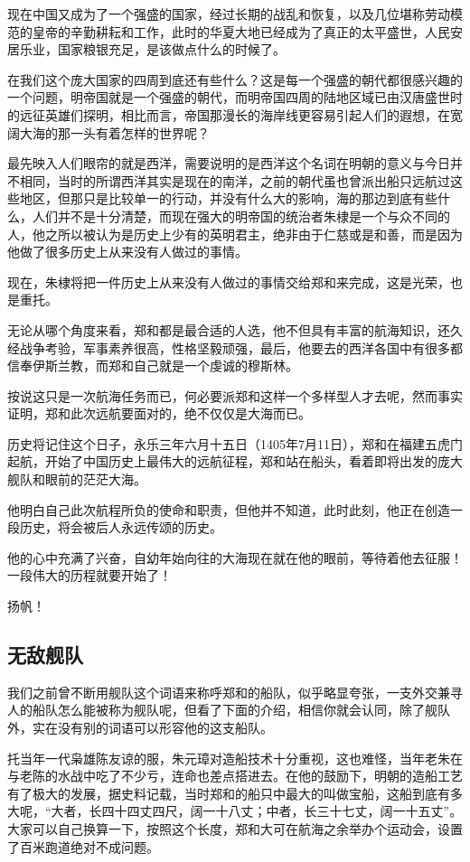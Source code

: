 \begin{multicols}{\theparacolNo}
现在中国又成为了一个强盛的国家，经过长期的战乱和恢复，以及几位堪称劳动模范的皇帝的辛勤耕耘和工作，此时的华夏大地已经成为了真正的太平盛世，人民安居乐业，国家粮银充足，是该做点什么的时候了。

在我们这个庞大国家的四周到底还有些什么？这是每一个强盛的朝代都很感兴趣的一个问题，明帝国就是一个强盛的朝代，而明帝国四周的陆地区域已由汉唐盛世时的远征英雄们探明，相比而言，帝国那漫长的海岸线更容易引起人们的遐想，在宽阔大海的那一头有着怎样的世界呢？

最先映入人们眼帘的就是西洋，需要说明的是西洋这个名词在明朝的意义与今日并不相同，当时的所谓西洋其实是现在的南洋，之前的朝代虽也曾派出船只远航过这些地区，但那只是比较单一的行动，并没有什么大的影响，海的那边到底有些什么，人们并不是十分清楚，而现在强大的明帝国的统治者朱棣是一个与众不同的人，他之所以被认为是历史上少有的英明君主，绝非由于仁慈或是和善，而是因为他做了很多历史上从来没有人做过的事情。

现在，朱棣将把一件历史上从来没有人做过的事情交给郑和来完成，这是光荣，也是重托。

无论从哪个角度来看，郑和都是最合适的人选，他不但具有丰富的航海知识，还久经战争考验，军事素养很高，性格坚毅顽强，最后，他要去的西洋各国中有很多都信奉伊斯兰教，而郑和自己就是一个虔诚的穆斯林。

按说这只是一次航海任务而已，何必要派郑和这样一个多样型人才去呢，然而事实证明，郑和此次远航要面对的，绝不仅仅是大海而已。

历史将记住这个日子，永乐三年六月十五日（1405年7月11日），郑和在福建五虎门起航，开始了中国历史上最伟大的远航征程，郑和站在船头，看着即将出发的庞大舰队和眼前的茫茫大海。

他明白自己此次航程所负的使命和职责，但他并不知道，此时此刻，他正在创造一段历史，将会被后人永远传颂的历史。

他的心中充满了兴奋，自幼年始向往的大海现在就在他的眼前，等待着他去征服！一段伟大的历程就要开始了！

扬帆！

\subsection{无敌舰队}
我们之前曾不断用舰队这个词语来称呼郑和的船队，似乎略显夸张，一支外交兼寻人的船队怎么能被称为舰队呢，但看了下面的介绍，相信你就会认同，除了舰队外，实在没有别的词语可以形容他的这支船队。

托当年一代枭雄陈友谅的服，朱元璋对造船技术十分重视，这也难怪，当年老朱在与老陈的水战中吃了不少亏，连命也差点搭进去。在他的鼓励下，明朝的造船工艺有了极大的发展，据史料记载，当时郑和的船只中最大的叫做宝船，这船到底有多大呢，“大者，长四十四丈四尺，阔一十八丈；中者，长三十七丈，阔一十五丈”。大家可以自己换算一下，按照这个长度，郑和大可在航海之余举办个运动会，设置了百米跑道绝对不成问题。


\end{multicols}
